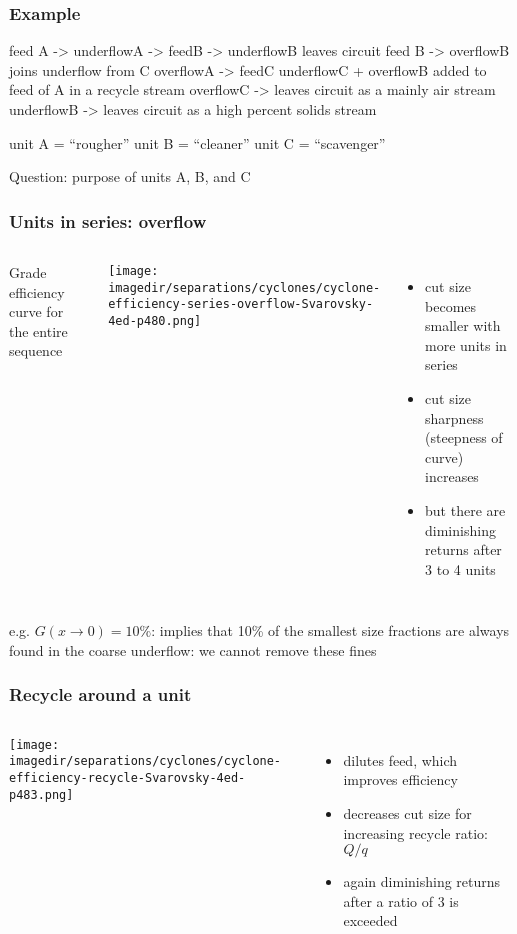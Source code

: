 \begin{frame}\frametitle{Example}
	
	feed A -> underflowA -> feedB -> underflowB leaves circuit
	feed B -> overflowB joins underflow from C
	overflowA -> feedC
	underflowC + overflowB added to feed of A in a recycle stream
	overflowC -> leaves circuit as a mainly air stream
	underflowB -> leaves circuit as a high percent solids stream
	
	unit A = ``rougher''
	unit B = ``cleaner''
	unit C = ``scavenger''
	
	Question: purpose of units A, B, and C
	
\end{frame}

\begin{frame}\frametitle{Units in series: overflow}
	\begin{columns}[t]
		Grade efficiency curve for the entire sequence
			\begin{center}
				\texttt{[image: \\imagedir/separations/cyclones/cyclone-efficiency-series-overflow-Svarovsky-4ed-p480.png]}
			\end{center}
		\begin{itemize}
			\item	cut size becomes smaller with more units in series
			\item	cut size sharpness (steepness of curve) increases
			\item	but there are diminishing returns after 3 to 4 units
		\end{itemize}
	\end{columns}
	\vspace{12pt}
	e.g. $G(x\rightarrow 0)=10\%$: implies that 10\% of the smallest size fractions are always found in the coarse underflow: we cannot remove these fines
\end{frame}

\begin{frame}\frametitle{Recycle around a unit}
	\begin{columns}[c]
			\begin{center}
				\texttt{[image: \\imagedir/separations/cyclones/cyclone-efficiency-recycle-Svarovsky-4ed-p483.png]}
			\end{center}
			\begin{itemize}
				\item	dilutes feed, which improves efficiency
				\item	decreases cut size for increasing recycle ratio: $Q/q$
				\item	again diminishing returns after a ratio of 3 is exceeded
			\end{itemize}
	\end{columns}
\end{frame}

